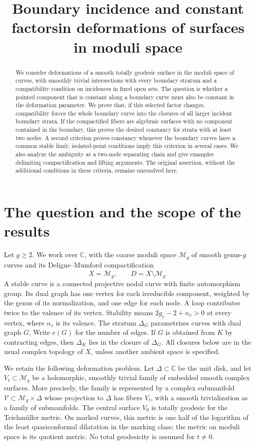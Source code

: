 \documentclass[11pt]{article}
\title{Boundary incidence and constant factors\newline in deformations of surfaces in moduli space}
\author{}
\date{}
\newcommand{\M}{\mathcal M}
\newcommand{\Mb}{\overline{\mathcal M}}
\newcommand{\C}{\mathbb C}
\theoremstyle{definition}
\theoremstyle{remark}
\begin{document}
\maketitle

\begin{abstract}
We consider deformations of a smooth totally geodesic surface in the moduli space of curves, with smoothly trivial intersections with every boundary stratum and a compatibility condition on incidences in fixed open sets. The question is whether a pointed component that is constant along a boundary curve must also be constant in the deformation parameter. We prove that, if this selected factor changes, compatibility forces the whole boundary curve into the closures of all larger incident boundary strata. If the compactified fibers are algebraic surfaces with no component contained in the boundary, this proves the desired constancy for strata with at least two nodes. A second criterion proves constancy whenever the boundary curves have a common stable limit; isolated-point conditions imply this criterion in several cases. We also analyze the ambiguity at a two-node separating chain and give examples delimiting compactification and lifting arguments. The original assertion, without the additional conditions in these criteria, remains unresolved here.
\end{abstract}

\section{The question and the scope of the results}

Let $g\geq2$. We work over $\C$, with the coarse moduli space $\M_g$ of smooth genus-$g$ curves and its Deligne--Mumford compactification
\[
 X=\Mb_g,\qquad D=X\setminus\M_g.
\]
A stable curve is a connected projective nodal curve with finite automorphism group. Its dual graph has one vertex for each irreducible component, weighted by the genus of its normalization, and one edge for each node. A loop contributes twice to the valence of its vertex. Stability means $2g_v-2+n_v>0$ at every vertex, where $n_v$ is its valence. The stratum $\Delta_G$ parametrizes curves with dual graph $G$. Write $e(G)$ for the number of edges. If $G$ is obtained from $K$ by contracting edges, then $\Delta_K$ lies in the closure of $\Delta_G$. All closures below are in the usual complex topology of $X$, unless another ambient space is specified.

We retain the following deformation problem. Let $\Delta\subset\C$ be the unit disk, and let $V_t\subset\M_g$ be a holomorphic, smoothly trivial family of embedded smooth complex surfaces. More precisely, the family is represented by a complex submanifold $\mathcal V\subset\M_g\times\Delta$ whose projection to $\Delta$ has fibers $V_t$, with a smooth trivialization as a family of submanifolds. The central surface $V_0$ is totally geodesic for the Teichm\"uller metric. On marked curves, this metric is one half of the logarithm of the least quasiconformal dilatation in the marking class; the metric on moduli space is its quotient metric. No total geodesicity is assumed for $t\ne0$.
\end{document}
